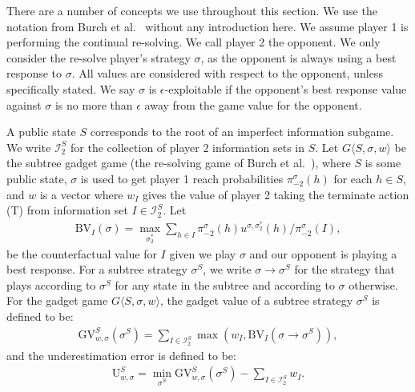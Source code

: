 There are a number of concepts we use throughout this section.
We use the notation from Burch et al.~\cite{cprg:cfrd} without any
introduction here.  We assume player 1 is performing the continual
re-solving.  We call player 2 the opponent.
We only consider the re-solve player's strategy $\sigma$, as the opponent is always using a best response to $\sigma$.
All values are considered with respect to the opponent, unless specifically stated.
We say $\sigma$ is $\epsilon$-exploitable if the opponent's best
response value against $\sigma$ is no more than $\epsilon$ away from
the game value for the opponent.

A public state $S$ corresponds to the root of an imperfect information subgame.
We write $\mathcal{I}_2^S$ for the collection of player 2 information sets in $S$. 
Let $G\langle S, \sigma, w\rangle$ be the subtree gadget game (the re-solving game of Burch et al.~\cite{cprg:cfrd}), where $S$ is some public state, $\sigma$ is used to get player 1 reach probabilities $\pi^{\sigma}_{-2}(h)$ for each $h \in S$, and $w$ is a vector where $w_I$ gives the value of player 2 taking the terminate action (T) from information set $I \in \mathcal{I}_2^S$.
Let 
\begin{align*}
\text{BV}_I(\sigma) = \max_{\sigma^*_2}\sum_{h \in I} \pi^{\sigma}_{-2}(h) u^{\sigma,\sigma_2^*}(h) / \pi^{\sigma}_{-2}(I),
\end{align*}
be the counterfactual value for $I$ given we play $\sigma$ and our opponent is playing a best response.
For a subtree strategy $\sigma^S$, we write $\sigma \to \sigma^S$ for the strategy that plays according to $\sigma^S$ for any state in the subtree and according to $\sigma$ otherwise.  For the gadget game $G\langle S, \sigma, w\rangle$, the gadget value of a subtree strategy $\sigma^S$ is defined to be:
\begin{align*}
  \text{GV}^S_{w,\sigma}(\sigma^S) = \sum_{I \in \mathcal{I}^S_2} \max(w_I,\text{BV}_I(\sigma\to\sigma^S)),
\end{align*}
and the underestimation error is defined to be:
\begin{align*}
  \text{U}^S_{w,\sigma} = \min_{\sigma^S} \text{GV}^S_{w,\sigma}(\sigma^S) - \sum_{I \in \mathcal{I}^S_2}w_I.
\end{align*}

